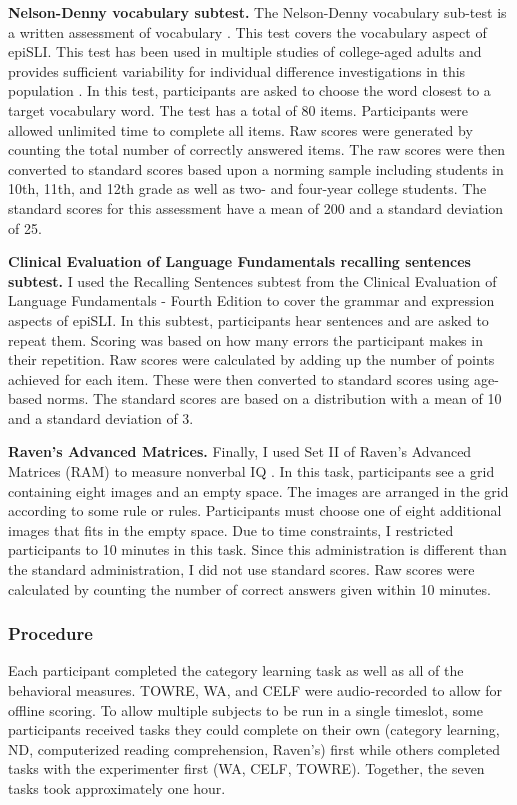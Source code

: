 \documentclass[../dissertation.tex]{subfiles}
\begin{document}
	\textbf{Nelson-Denny vocabulary subtest.} The Nelson-Denny vocabulary sub-test is a written assessment of vocabulary \citep{Brown1981}. This test covers the vocabulary aspect of epiSLI. This test has been used in multiple studies of college-aged adults and provides sufficient variability for individual difference investigations in this population \citetext{e.g., \citealt{Boudewyn2015}; \citealt{Stafura2014}}. In this test, participants are asked to choose the word closest to a target vocabulary word. The test has a total of 80 items. Participants were allowed unlimited time to complete all items. Raw scores were generated by counting the total number of correctly answered items. The raw scores were then converted to standard scores based upon a norming sample including students in 10th, 11th, and 12th grade as well as two- and four-year college students. The standard scores for this assessment have a mean of 200 and a standard deviation of 25. \par
	\textbf{Clinical Evaluation of Language Fundamentals recalling sentences subtest.} I used the Recalling Sentences subtest from the Clinical Evaluation of Language Fundamentals - Fourth Edition \citetext{CELF; \citealt{Semel2006}} to cover the grammar and expression aspects of epiSLI. In this subtest, participants hear sentences and are asked to repeat them. Scoring was based on how many errors the participant makes in their repetition. Raw scores were calculated by adding up the number of points achieved for each item. These were then converted to standard scores using age-based norms. The standard scores are based on a distribution with a mean of 10 and a standard deviation of 3. \par
	\textbf{Raven's Advanced Matrices.} Finally, I used Set II of Raven's Advanced Matrices (RAM) to measure nonverbal IQ \citep{Raven1998}. In this task, participants see a grid containing eight images and an empty space. The images are arranged in the grid according to some rule or rules. Participants must choose one of eight additional images that fits in the empty space. Due to time constraints, I restricted participants to 10 minutes in this task. Since this administration is different than the standard administration, I did not use standard scores. Raw scores were calculated by counting the number of correct answers given within 10 minutes.

\subsubsection{Procedure}
	Each participant completed the category learning task as well as all of the behavioral measures. TOWRE, WA, and CELF were audio-recorded to allow for offline scoring. To allow multiple subjects to be run in a single timeslot, some participants received tasks they could complete on their own (category learning, ND, computerized reading comprehension, Raven's) first while others completed tasks with the experimenter first (WA, CELF, TOWRE). Together, the seven tasks took approximately one hour.
	
\end{document}
